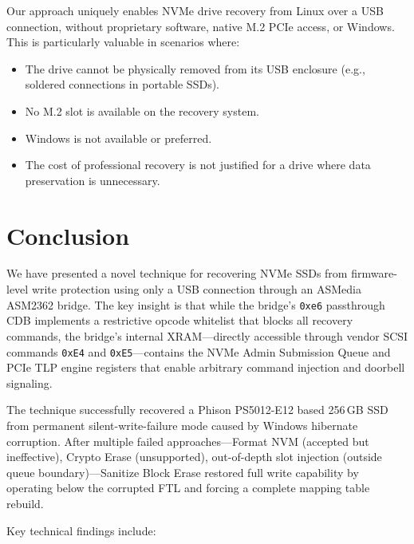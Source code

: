 \documentclass[conference]{IEEEtran}
\begin{document}
Our approach uniquely enables NVMe drive recovery from Linux over a USB
connection, without proprietary software, native M.2 PCIe access, or
Windows. This is particularly valuable in scenarios where:
\begin{itemize}
\item The drive cannot be physically removed from its USB enclosure
  (e.g., soldered connections in portable SSDs).
\item No M.2 slot is available on the recovery system.
\item Windows is not available or preferred.
\item The cost of professional recovery is not justified for a drive
  where data preservation is unnecessary.
\end{itemize}


\section{Conclusion}
\label{sec:conclusion}

We have presented a novel technique for recovering NVMe SSDs from
firmware-level write protection using only a USB connection through an
ASMedia ASM2362 bridge. The key insight is that while the bridge's
\texttt{0xe6} passthrough CDB implements a restrictive opcode whitelist
that blocks all recovery commands, the bridge's internal XRAM---directly
accessible through vendor SCSI commands \texttt{0xE4} and
\texttt{0xE5}---contains the NVMe Admin Submission Queue and PCIe TLP
engine registers that enable arbitrary command injection and doorbell
signaling.

The technique successfully recovered a Phison PS5012-E12 based
256\,GB SSD from permanent silent-write-failure mode caused by Windows
hibernate corruption. After multiple failed approaches---Format NVM
(accepted but ineffective), Crypto Erase (unsupported), out-of-depth
slot injection (outside queue boundary)---Sanitize Block Erase restored
full write capability by operating below the corrupted FTL and forcing a
complete mapping table rebuild.

Key technical findings include:
\end{document}
